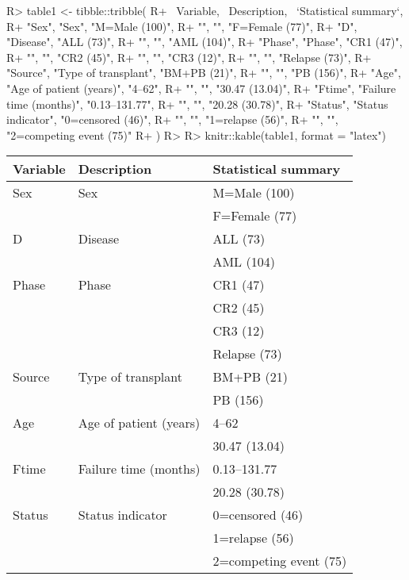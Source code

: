 \documentclass[article]{jss}
\begin{document}
\begin{CodeChunk}

\begin{CodeInput}
R> table1 <- tibble::tribble(
R+     ~Variable, ~Description, ~`Statistical summary`,
R+     "Sex", "Sex", "M=Male (100)",
R+     "", "", "F=Female (77)",
R+     "D", "Disease", "ALL (73)",
R+     "", "", "AML (104)",
R+     "Phase", "Phase", "CR1 (47)", 
R+     "", "", "CR2 (45)", 
R+     "", "", "CR3 (12)", 
R+     "", "", "Relapse (73)",
R+     "Source", "Type of transplant", "BM+PB (21)", 
R+     "", "", "PB (156)",
R+     "Age", "Age of patient (years)", "4–62", 
R+     "", "", "30.47 (13.04)",
R+     "Ftime", "Failure time (months)", "0.13–131.77",
R+     "", "", "20.28 (30.78)",
R+     "Status", "Status indicator", "0=censored (46)", 
R+     "", "", "1=relapse (56)", 
R+     "", "", "2=competing event (75)"
R+ )
R> 
R> knitr::kable(table1, format = "latex")
\end{CodeInput}

\begin{tabular}{l|l|l}
\hline
Variable & Description & Statistical summary\\
\hline
Sex & Sex & M=Male (100)\\
\hline
 &  & F=Female (77)\\
\hline
D & Disease & ALL (73)\\
\hline
 &  & AML (104)\\
\hline
Phase & Phase & CR1 (47)\\
\hline
 &  & CR2 (45)\\
\hline
 &  & CR3 (12)\\
\hline
 &  & Relapse (73)\\
\hline
Source & Type of transplant & BM+PB (21)\\
\hline
 &  & PB (156)\\
\hline
Age & Age of patient (years) & 4–62\\
\hline
 &  & 30.47 (13.04)\\
\hline
Ftime & Failure time (months) & 0.13–131.77\\
\hline
 &  & 20.28 (30.78)\\
\hline
Status & Status indicator & 0=censored (46)\\
\hline
 &  & 1=relapse (56)\\
\hline
 &  & 2=competing event (75)\\
\hline
\end{tabular}

\end{CodeChunk}
\end{document}
